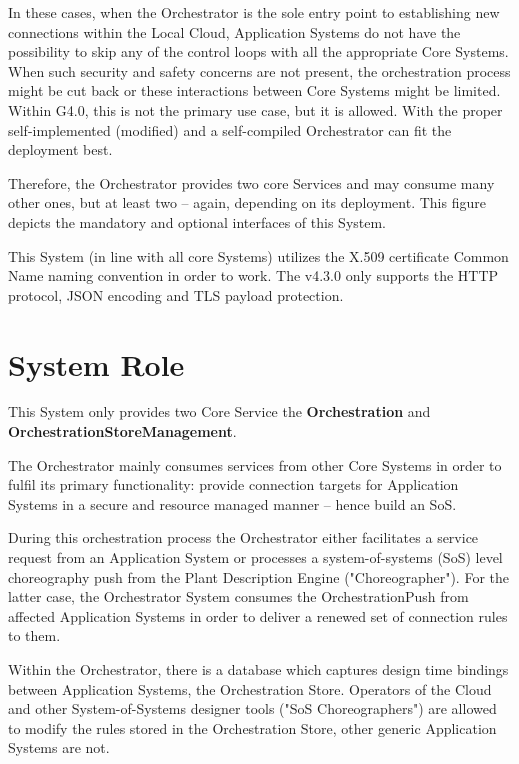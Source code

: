\documentclass[a4paper]{arrowhead}
\begin{document}
In these cases, when the Orchestrator is the sole entry point to establishing new connections within the Local Cloud, Application Systems do not have the possibility to skip any of the control loops with all the appropriate Core Systems. When such security and safety concerns are not present, the orchestration process might be cut back or these interactions between Core Systems might be limited. Within G4.0, this is not the primary use case, but it is allowed. With the proper self-implemented (modified) and a self-compiled Orchestrator can fit the deployment best.

Therefore, the Orchestrator provides two core Services and may consume many other ones, but at least two -- again, depending on its deployment. This figure depicts the mandatory and optional interfaces of this System.

This System (in line with all core Systems) utilizes the X.509 certificate Common Name naming convention in order to work.
The v4.3.0 only supports the HTTP protocol, JSON encoding and TLS payload protection. 


\section{System Role}
\label{sec:role}

This System only provides two Core Service the \textbf{Orchestration} and \textbf{OrchestrationStoreManagement}. 

The Orchestrator mainly consumes services from other Core Systems in order to fulfil its primary functionality: provide connection targets for Application Systems in a secure and resource managed manner -- hence build an SoS.

During this orchestration process the Orchestrator either facilitates a service request from an Application System or processes a system-of-systems (SoS) level choreography push from the Plant Description Engine ("Choreographer"). For the latter case, the Orchestrator System consumes the OrchestrationPush from affected Application Systems in order to deliver a renewed set of connection rules to them.

Within the Orchestrator, there is a database which captures design time bindings between Application Systems, the Orchestration Store. Operators of the Cloud and other System-of-Systems designer tools ("SoS Choreographers") are allowed to modify the rules stored in the Orchestration Store, other generic Application Systems are not.
\end{document}
